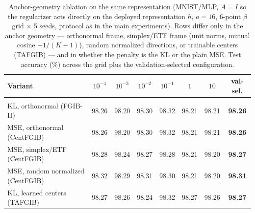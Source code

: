 \begin{table}[t]
\caption{Anchor-geometry ablation on the same representation (MNIST/MLP, $A{=}I$ so the regularizer acts directly on the deployed representation $h$, $a=16$, 6-point $\beta$ grid $\times$ 5 seeds, protocol as in the main experiments). Rows differ only in the anchor geometry --- orthonormal frame, simplex/ETF frame (unit norms, mutual cosine $-1/(K-1)$), random normalized directions, or trainable centers (TAFGIB) --- and in whether the penalty is the KL or the plain MSE. Test accuracy (\%) across the grid plus the validation-selected configuration.}
\label{tab:geometry}
\begin{center}\small
\begin{tabular}{lccccccc}
Variant & $10^{-4}$ & $10^{-3}$ & $10^{-2}$ & $10^{-1}$ & $1$ & $10$ & val-sel. \\ \hline \\[-1.8ex]
KL, orthonormal (FGIB-H) & 98.26 & 98.20 & 98.30 & 98.32 & 98.21 & 98.21 & \textbf{98.26} \\
MSE, orthonormal (CentFGIB) & 98.26 & 98.20 & 98.30 & 98.32 & 98.21 & 98.21 & \textbf{98.26} \\
MSE, simplex/ETF (CentFGIB) & 98.28 & 98.24 & 98.27 & 98.28 & 98.21 & 98.20 & \textbf{98.27} \\
MSE, random normalized (CentFGIB) & 98.32 & 98.29 & 98.31 & 98.30 & 98.21 & 98.20 & \textbf{98.31} \\
KL, learned centers (TAFGIB) & 98.27 & 98.26 & 98.24 & 98.32 & 98.27 & 98.26 & \textbf{98.27} \\
\end{tabular}\end{center}\end{table}

